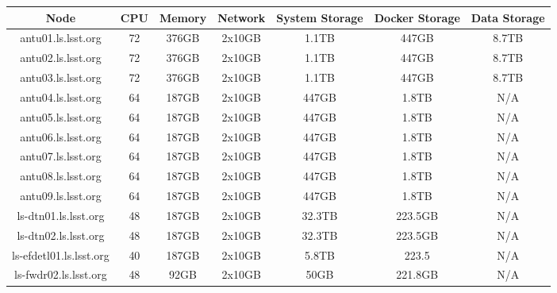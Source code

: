\begin{center}
  \small
  \begin{tabular}{||c c c c c c c||}
    \hline
    \textbf{Node} & \textbf{CPU} & \textbf{Memory} & \textbf{Network} & \textbf{System Storage} & \textbf{Docker Storage} & \textbf{Data Storage} \\ [0.5ex]
    \hline
    antu01.ls.lsst.org & 72 & 376GB & 2x10GB & 1.1TB & 447GB & 8.7TB \\
    \hline
    antu02.ls.lsst.org & 72 & 376GB & 2x10GB & 1.1TB & 447GB & 8.7TB \\
    \hline
    antu03.ls.lsst.org & 72 & 376GB & 2x10GB & 1.1TB & 447GB & 8.7TB \\
    \hline
    antu04.ls.lsst.org & 64 & 187GB & 2x10GB & 447GB & 1.8TB & N/A \\
    \hline
    antu05.ls.lsst.org & 64 & 187GB & 2x10GB & 447GB & 1.8TB & N/A \\
    \hline
    antu06.ls.lsst.org & 64 & 187GB & 2x10GB & 447GB & 1.8TB & N/A \\
    \hline
    antu07.ls.lsst.org & 64 & 187GB & 2x10GB & 447GB & 1.8TB & N/A \\
    \hline
    antu08.ls.lsst.org & 64 & 187GB & 2x10GB & 447GB & 1.8TB & N/A \\
    \hline
    antu09.ls.lsst.org & 64 & 187GB & 2x10GB & 447GB & 1.8TB & N/A \\
    \hline
    ls-dtn01.ls.lsst.org & 48 & 187GB & 2x10GB & 32.3TB & 223.5GB & N/A \\
    \hline
    ls-dtn02.ls.lsst.org & 48 & 187GB & 2x10GB & 32.3TB & 223.5GB & N/A \\
    \hline
    ls-efdetl01.ls.lsst.org & 40 & 187GB & 2x10GB & 5.8TB & 223.5 & N/A \\
    \hline
    ls-fwdr02.ls.lsst.org & 48 & 92GB & 2x10GB & 50GB & 221.8GB & N/A \\
    \hline
  \end{tabular}
\end{center}

\newpage
